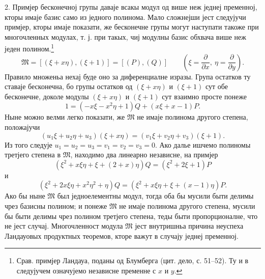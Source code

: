 ﻿\documentclass[11pt]{article}
\begin{document}
2. Примјер бесконечној групы даваје всакы модул од више неж једнеј пременној, кторы имаје базис само из једного полинома. Мало сложнејши јест следујучи примјер, кторы имаје показати, же бесконечне групы могут наступати такоже при многочленных модулах, т. ј. при такых, чиј модулны базис обхвача више неж једен полином.\footnote{Срав. примјер Ландауа, поданы од Блумберга (цит. дело, с. 51--52). Ту и в следујучем означујемо независне пременне с \(x\) и \(y\).}
\[
 \mathfrak M=[(\xi+x\eta),(\xi+1)]=[(P),(Q)]
 \qquad\left(\xi=\frac{\partial}{\partial x},\ \eta=\frac{\partial}{\partial y}\right).
\]
Правило множеньа нехај буде оно за диференциалне изразы. Група остатков ту ставаје бесконечна, бо групы остатков од \((\xi+x\eta)\) и \((\xi+1)\) сут обе бесконечне, доколе модулы \((\xi+x\eta)\) и \((\xi+1)\) сут взаимно просте понеже
\[
 1=(-x\xi-x^2\eta+1)Q+(x\xi+x-1)P.
\]
Ныне можно велми легко показати, же \(\mathfrak M\) не имаје полинома другого степена, положајучи
\[
 (u_1\xi+u_2\eta+u_3)(\xi+x\eta)=(v_1\xi+v_2\eta+v_3)(\xi+1).
\]
Из того следује \(u_1=u_2=u_3=v_1=v_2=v_3=0\). Ако далье ишчемо полиномы третјего степена в \(\mathfrak M\), находимо два линеарно независне, на примјер
\[
 (\xi^2+x\xi\eta+\xi+(2+x)\eta)Q=(\xi^2+2\xi+1)P
\]
и
\[
 (\xi^2+2x\xi\eta+x^2\eta^2+\eta)Q
 =(\xi^2+x\xi\eta+\xi+(x-1)\eta)P.
\]
Ако бы ныне \(\mathfrak M\) был једноелементны модул, тогда оба бы мусили быти делимы чрез базисны полином; и понеже \(\mathfrak M\) не имаје полинома другого степена, мусили бы быти делимы чрез полином третјего степена, теды быти пропорционалне, что не јест случај. Многочленност модула \(\mathfrak M\) јест внутришньа причина неуспеха Ландауовых продуктных теоремов, кторе важут в случају једнеј пременној.
\end{document}
